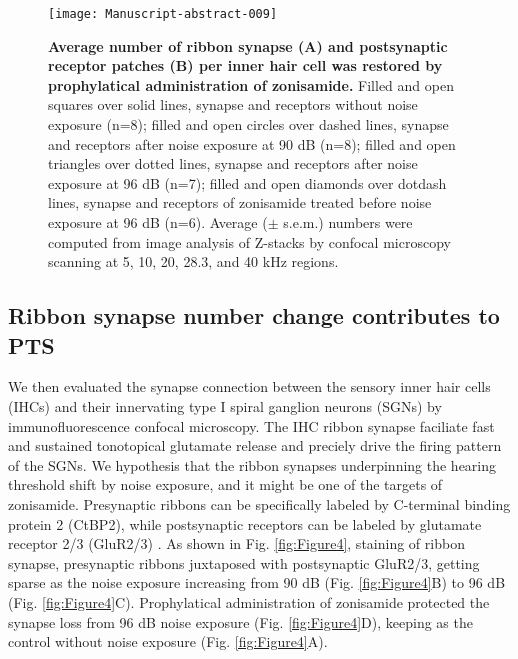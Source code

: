 \documentclass[11pt]{article}
\begin{document}
\begin{figure}[ht!]
\centering
\texttt{[image: Manuscript-abstract-009]}
\caption{{\bf {Average number of ribbon synapse (A) and postsynaptic receptor patches (B) per inner hair cell was restored by prophylatical administration of zonisamide.}}  Filled and open squares over solid lines, synapse and receptors without noise exposure (n=8); filled  and open circles over dashed lines, synapse and receptors after noise exposure at 90 dB (n=8); filled  and open triangles over dotted lines, synapse and receptors after noise exposure at 96 dB (n=7); filled  and open diamonds over dotdash lines, synapse and receptors of zonisamide treated before noise exposure at 96 dB (n=6). Average ($\pm$ s.e.m.) numbers were computed from image analysis of Z-stacks by confocal microscopy scanning at 5, 10, 20, 28.3, and 40 kHz regions.}
\label{fig:Figure5}
\end{figure}


\subsection {Ribbon synapse number change contributes to PTS}
We then evaluated the synapse connection between the sensory inner hair cells (IHCs) and their innervating type I spiral ganglion neurons (SGNs) by immunofluorescence confocal microscopy. The IHC ribbon synapse faciliate fast and sustained tonotopical glutamate release and preciely drive the firing pattern of the SGNs. We hypothesis that the ribbon synapses underpinning the hearing threshold shift by noise exposure, and it might be one of the targets of zonisamide. Presynaptic ribbons can be specifically labeled by C-terminal binding protein 2 (CtBP2), while postsynaptic receptors can be labeled by glutamate receptor 2/3 (GluR2/3) \cite{Khimich2005,Liberman2011}. As shown in Fig. \ref{fig:Figure4}, staining of ribbon synapse, presynaptic ribbons juxtaposed with postsynaptic GluR2/3, getting sparse as the noise exposure increasing from 90 dB (Fig. \ref{fig:Figure4}B) to 96 dB (Fig. \ref{fig:Figure4}C). Prophylatical administration of zonisamide protected the synapse loss from 96 dB noise exposure (Fig. \ref{fig:Figure4}D), keeping as the control without noise exposure (Fig. \ref{fig:Figure4}A). 
\end{document}
